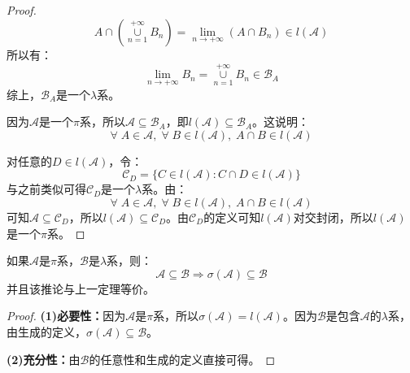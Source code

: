 \begin{proof}
\begin{equation*}
		A\cap\left(\underset{n=1}{\overset{+\infty}{\cup}}B_n\right)=\lim_{n\to+\infty}(A\cap B_n)\in l(\mathscr{A})
	\end{equation*}
	所以有：
	\begin{equation*}
		\lim_{n\to+\infty}B_n=\underset{n=1}{\overset{+\infty}{\cup}}B_n\in\mathscr{B}_A
	\end{equation*}
	综上，$\mathscr{B}_A$是一个$\lambda$系。\par
	因为$\mathscr{A}$是一个$\pi$系，所以$\mathscr{A}\subseteq\mathscr{B}_A$，即$l(\mathscr{A})\subseteq\mathscr{B}_A$。这说明：
	\begin{equation*}
		\forall\;A\in\mathscr{A},\;\forall\;B\in l(\mathscr{A}),\;A\cap B\in l(\mathscr{A})
	\end{equation*}\par
	对任意的$D\in l(\mathscr{A})$，令：
	\begin{equation*}
		\mathscr{C}_D=\{C\in l(\mathscr{A}):C\cap D\in l(\mathscr{A})\}
	\end{equation*}
	与之前类似可得$\mathscr{C}_D$是一个$\lambda$系。由：
	\begin{equation*}
		\forall\;A\in\mathscr{A},\;\forall\;B\in l(\mathscr{A}),\;A\cap B\in l(\mathscr{A})
	\end{equation*}
	可知$\mathscr{A}\subseteq\mathscr{C}_D$，所以$l(\mathscr{A})\subseteq\mathscr{C}_D$。由$\mathscr{C}_D$的定义可知$l(\mathscr{A})$对交封闭，所以$l(\mathscr{A})$是一个$\pi$系。
\end{proof}
\begin{corollary}\label{cor:SigmaPi=LambdaPi}
	如果$\mathscr{A}$是$\pi$系，$\mathscr{B}$是$\lambda$系，则：
	\begin{equation*}
		\mathscr{A}\subseteq\mathscr{B}\Rightarrow\sigma(\mathscr{A})\subseteq\mathscr{B}
	\end{equation*}
	并且该推论与上一定理等价。
\end{corollary}
\begin{proof}
	\textbf{(1)必要性：}因为$\mathscr{A}$是$\pi$系，所以$\sigma(\mathscr{A})=l(\mathscr{A})$。因为$\mathscr{B}$是包含$\mathscr{A}$的$\lambda$系，由生成的定义，$\sigma(\mathscr{A})\subseteq\mathscr{B}$。\par
	\textbf{(2)充分性：}由$\mathscr{B}$的任意性和生成的定义直接可得。
\end{proof}

